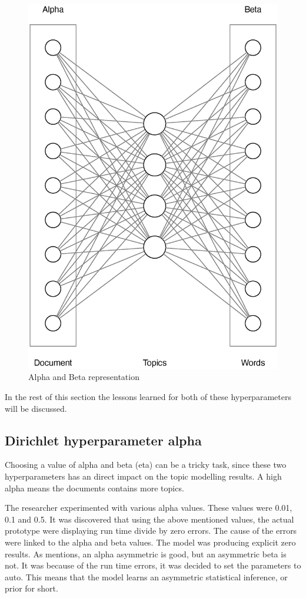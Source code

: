 \begin{figure}[htbp]
\centering
\includegraphics[width=12cm]{./figures/alpha1.eps}
\caption{Alpha and Beta representation}
\label{fig:alphaandbeta}
\end{figure}
In the rest of this section the lessons learned for both of these hyperparameters will be discussed.

\subsection{Dirichlet hyperparameter alpha}
Choosing a value of alpha and beta (eta) can be a tricky task, since these two hyperparameters has an direct impact on the topic modelling results. A high alpha means the documents contains more topics.

The researcher experimented with various alpha values. These values were 0.01, 0.1 and 0.5. It was discovered that using the above mentioned values, the actual prototype were displaying run time divide by zero errors. The cause of the errors were linked to the alpha and beta values. The model was producing explicit zero results.
As  mentions, an alpha asymmetric is good, but an asymmetric beta is not.
It was because of the run time errors, it was decided to set the parameters to auto. This means that the model learns an asymmetric statistical inference, or prior for short.

